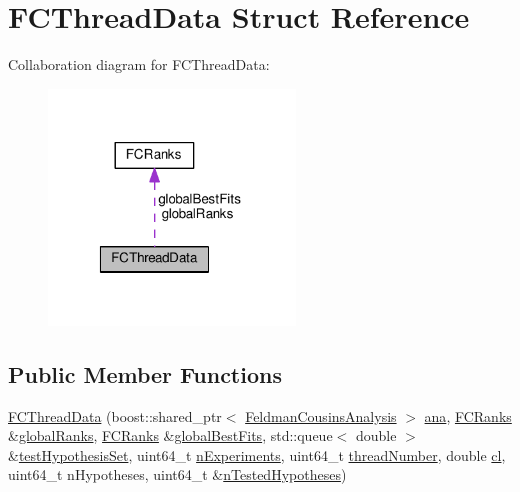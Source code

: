 \hypertarget{structFCThreadData}{\section{F\-C\-Thread\-Data Struct Reference}
\label{structFCThreadData}
}


Collaboration diagram for F\-C\-Thread\-Data\-:
\nopagebreak
\begin{figure}[H]
\begin{center}
\leavevmode
\includegraphics[width=186pt]{structFCThreadData__coll__graph}
\end{center}
\end{figure}
\subsection*{Public Member Functions}
\begin{DoxyCompactItemize}
\item 
\hyperlink{structFCThreadData_a2cf5d9db69def87add57733397912dfa}{F\-C\-Thread\-Data} (boost\-::shared\-\_\-ptr$<$ \hyperlink{classFeldmanCousinsAnalysis}{Feldman\-Cousins\-Analysis} $>$ \hyperlink{structFCThreadData_aab12c7f409e8e59d773d931a4d0b8187}{ana}, \hyperlink{classFCRanks}{F\-C\-Ranks} \&\hyperlink{structFCThreadData_afdceefad89e168d411041e126fa48a0c}{global\-Ranks}, \hyperlink{classFCRanks}{F\-C\-Ranks} \&\hyperlink{structFCThreadData_a8a5d6203aab57c1c05f4d6a2fa549344}{global\-Best\-Fits}, std\-::queue$<$ double $>$ \&\hyperlink{structFCThreadData_a74bbf1a21613e4c77e011a14c1f26c6a}{test\-Hypothesis\-Set}, uint64\-\_\-t \hyperlink{structFCThreadData_a721d95b6dbaeae9dd9a1772794cbc2b2}{n\-Experiments}, uint64\-\_\-t \hyperlink{structFCThreadData_aff011a8ec29fb8962da9474440525374}{thread\-Number}, double \hyperlink{structFCThreadData_a11a41bb60670a5b8a13b3c9dd961d0d0}{cl}, uint64\-\_\-t n\-Hypotheses, uint64\-\_\-t \&\hyperlink{structFCThreadData_ab907b43fdcbc5b14b65cd2ca79306806}{n\-Tested\-Hypotheses})
\end{DoxyCompactItemize}
